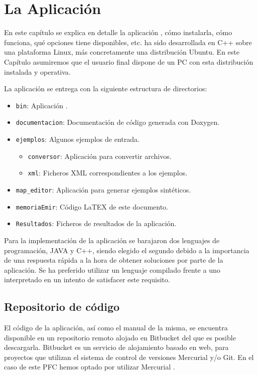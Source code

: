%
%
%
%

\chapter{La Aplicación \CSUO{}} \label{chap:aplication}
En este capítulo se explica en detalle la aplicación \CSUO{}, cómo
instalarla, cómo funciona, qué opciones tiene disponibles, etc. 
\CSUO{} ha sido desarrollada en C++ sobre una plataforma Linux, más
concretamente una distribución Ubuntu. 
En este Capítulo asumiremos que el usuario final dispone de un PC con esta distribución instalada y operativa.

La aplicación se entrega con la siguiente estructura de directorios:

\begin{itemize}
\item \texttt{bin}: Aplicación \CSUO{}.
\item \texttt{documentacion}: Documentación de código generada con Doxygen.
\item \texttt{ejemplos}: Algunos ejemplos de entrada.
  \begin{itemize}
  \item \texttt{conversor}: Aplicación para convertir archivos.
  \item \texttt{xml}: Ficheros XML correspondientes a los ejemplos.
  \end{itemize}
\item \texttt{map\_editor}: Aplicación para generar ejemplos sintéticos.
\item \texttt{memoriaEmir}: Código LaTEX de este documento.
\item \texttt{Resultados}: Ficheros de resultados de la aplicación.
\end{itemize}

Para la implementación de la aplicación se barajaron dos lenguajes de
programación, JAVA y C++, siendo elegido el segundo debido a la importancia
de una respuesta rápida a la hora de obtener soluciones por parte de la aplicación.
Se ha preferido utilizar un lenguaje compilado frente a uno interpretado en un intento
de satisfacer este requisito.
\section{Repositorio de código}
El código de la aplicación, así como el manual de la misma, se encuentra disponible en un
repositorio remoto alojado en Bitbucket \cite{Web:BIT} del que es posible descargarla.
Bitbucket es un servicio
de alojamiento basado en web, para proyectos que utilizan el sistema de
control de versiones Mercurial y/o Git. 
En el caso de este PFC hemos optado por utilizar Mercurial \cite{Web:MERCURIAL}.

